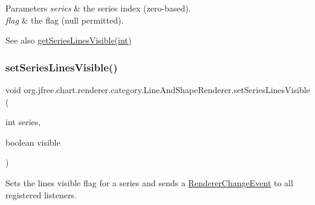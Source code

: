 \begin{DoxyParams}{Parameters}
{\em series} & the series index (zero-\/based). \\
\hline
{\em flag} & the flag ({\ttfamily null} permitted).\\
\hline
\end{DoxyParams}
\begin{DoxySeeAlso}{See also}
\mbox{\hyperlink{classorg_1_1jfree_1_1chart_1_1renderer_1_1category_1_1_line_and_shape_renderer_a644c14daf7af65eb496c489825f639d3}{get\+Series\+Lines\+Visible(int)}} 
\end{DoxySeeAlso}
\mbox{\label{classorg_1_1jfree_1_1chart_1_1renderer_1_1category_1_1_line_and_shape_renderer_a6169c2b206e917b1267318bda2e061d7}} 
\subsubsection{\texorpdfstring{set\+Series\+Lines\+Visible()}{setSeriesLinesVisible()}\hspace{0.1cm}{\footnotesize\ttfamily [2/2]}}
{\footnotesize\ttfamily void org.\+jfree.\+chart.\+renderer.\+category.\+Line\+And\+Shape\+Renderer.\+set\+Series\+Lines\+Visible (\begin{DoxyParamCaption}\item[{int}]{series,  }\item[{boolean}]{visible }\end{DoxyParamCaption})}

Sets the \textquotesingle{}lines visible\textquotesingle{} flag for a series and sends a \mbox{\hyperlink{}{Renderer\+Change\+Event}} to all registered listeners.


